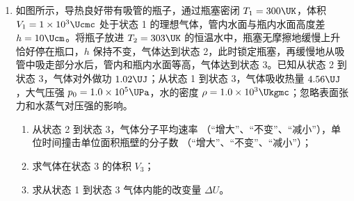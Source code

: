 \documentclass[\gkver]{gaokaozhenti}
\begin{document}
\begin{enumerate}
{以后保持 $S_{2}$ 接 b，改变电阻箱的阻值 $R_{1}$，根据

$R_{t} = \left( \frac{U}{U'} - 1 \right)R_{1}$

可得热敏电阻 $R_{t}$ 的值。
}

\item
如图所示，导热良好带有吸管的瓶子，通过瓶塞密闭 $T_{1} = 300 \UK$，体积 $V_{1} = 1 \times 10^{3} \Ucmc$ 处于状态 1 的理想气体，管内水面与瓶内水面高度差 $h = 10 \Ucm$。将瓶子放进 $T_{2} = 303 \UK$ 的恒温水中，瓶塞无摩擦地缓慢上升恰好停在瓶口，$h$ 保持不变，气体达到状态 2，此时锁定瓶塞，再缓慢地从吸管中吸走部分水后，管内和瓶内水面等高，气体达到状态 3。已知从状态 2 到状态 3，气体对外做功 $1.02 \UJ$；从状态 1 到状态 3，气体吸收热量 $4.56 \UJ$，大气压强 $p_{0} = 1.0 \times 10^{5} \UPa$，水的密度 $\rho = 1.0 \times 10^{3} \Ukgmc$；忽略表面张力和水蒸气对压强的影响。

\begin{enumerate}
\item
从状态 2 到状态 3，气体分子平均速率 （“增大”、“不变”、“减小”），单位时间撞击单位面积瓶壁的分子数 （“增大”、“不变”、“减小”）；

\item
求气体在状态 3 的体积 $V_{3}$；

\item
求从状态 1 到状态 3 气体内能的改变量 $\Delta U$。
\end{enumerate}


\end{enumerate}
\end{document}
